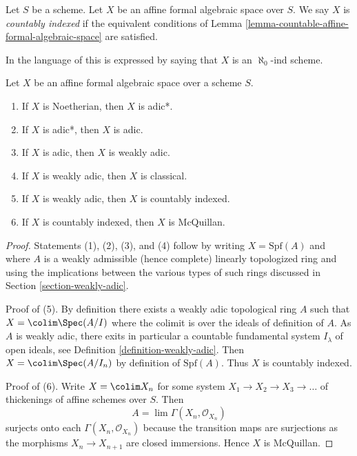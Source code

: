 \begin{definition}
\label{definition-countable}
Let $S$ be a scheme. Let $X$ be an affine formal algebraic space over $S$.
We say $X$ is {\it countably indexed} if the equivalent conditions of
Lemma \ref{lemma-countable-affine-formal-algebraic-space} are satisfied.
\end{definition}

\noindent
In the language of \cite{BVGD} this is expressed by saying that
$X$ is an $\aleph_0$-ind scheme.

\begin{lemma}
\label{lemma-implications-between-types}
Let $X$ be an affine formal algebraic space over a scheme $S$.
\begin{enumerate}
\item If $X$ is Noetherian, then $X$ is adic*.
\item If $X$ is adic*, then $X$ is adic.
\item If $X$ is adic, then $X$ is weakly adic.
\item If $X$ is weakly adic, then $X$ is classical.
\item If $X$ is weakly adic, then $X$ is countably indexed.
\item If $X$ is countably indexed, then $X$ is McQuillan.
\end{enumerate}
\end{lemma}

\begin{proof}
Statements (1), (2), (3), and (4) follow by writing $X = \text{Spf}(A)$
and where $A$ is a weakly admissible (hence complete) linearly
topologized ring and using the implications between the various
types of such rings discussed in Section \ref{section-weakly-adic}.

\medskip\noindent
Proof of (5). By definition there exists a weakly adic topological ring $A$
such that $X = \colim \Spec(A/I)$ where the colimit is over the ideals
of definition of $A$. As $A$ is weakly adic, there exits in particular
a countable fundamental system $I_\lambda$ of open ideals, see
Definition \ref{definition-weakly-adic}.
Then $X = \colim \Spec(A/I_n)$ by definition of $\text{Spf}(A)$.
Thus $X$ is countably indexed.

\medskip\noindent
Proof of (6). Write $X = \colim X_n$ for some system
$X_1 \to X_2 \to X_3 \to \ldots$ of thickenings of affine
schemes over $S$. Then
$$
A = \lim \Gamma(X_n, \mathcal{O}_{X_n})
$$
surjects onto each $\Gamma(X_n, \mathcal{O}_{X_n})$ because the transition
maps are surjections as the morphisms $X_n \to X_{n + 1}$ are closed
immersions. Hence $X$ is McQuillan.
\end{proof}

